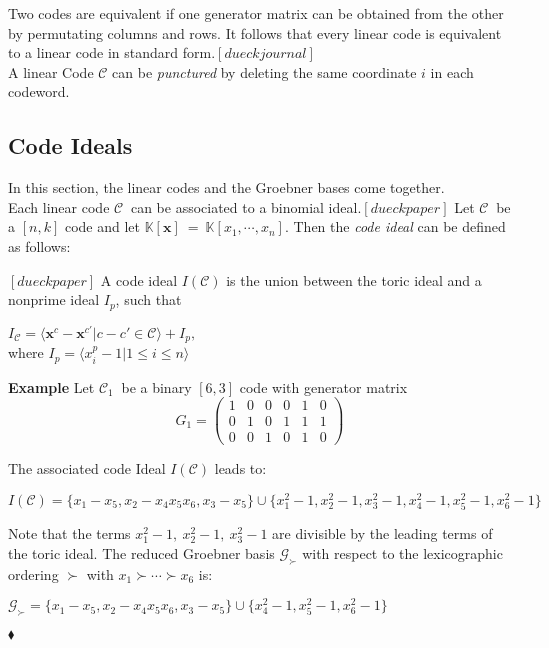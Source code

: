 Two codes are equivalent if one generator matrix can be obtained from the other by permutating columns and rows.
It follows that every linear code is equivalent to a linear code in standard form.$[dueckjournal]$ \\

A linear Code $\mathcal{C}$ can be \textit{punctured} by deleting the same coordinate $i$ in each codeword.


\subsection{Code Ideals}
\label{subsec:codeideals}
In this section, the linear codes and the Groebner bases come together.\\
Each linear code $\mathcal{C}~$ can be associated to a binomial ideal.$[dueckpaper]$ Let $\mathcal{C}~$ be a $[n,k]$ code and let 
$\mathbb{K}[\textbf{x}]~=~\mathbb{K}[x_{1},\cdots,x_{n}]$.
Then the \textit{code ideal} can be defined as follows:

\begin{env_definition}
$[dueckpaper]$ A code ideal $I(\mathcal{C})$ is the union between the toric ideal and a nonprime ideal $I_{p}$, such that
\begin{center}
$ I_{\mathcal{C}} = \langle \textbf{x}^{c} - \textbf{x}^{c'} | c - c' \in \mathcal{C}  \rangle + I_{p},$\\
\textrm{where}
 $I_{p} = \langle x_{i}^{p} - 1 | 1 \leq i \leq n \rangle $
\end{center}
\end{env_definition}


\textbf{Example} Let $\mathcal{C}_{1}~$ be a binary $[6,3]$ code with generator matrix
\[
G_{1} =
\begin{pmatrix}
1 & 0 & 0 & 0 & 1 & 0 \\ 
0 & 1 & 0 & 1 & 1 & 1 \\  
0 & 0 & 1 & 0 & 1 & 0  
\end{pmatrix} 
\]

The associated code Ideal $I(\mathcal{C})$ leads to: \newline
\begin{center}
$I(\mathcal{C}) = \{x_{1}-x_{5},x_{2}-x_{4}x_{5}x_{6},x_{3}-x_{5}  \} \cup \{x_{1}^{2}-1,x_{2}^{2}-1,x_{3}^{2}-1,x_{4}^{2}-1,x_{5}^{2}-1,x_{6}^{2}-1\}  $
\end{center}
Note that the terms $x_{1}^{2}-1,~x_{2}^{2}-1,~x_{3}^{2}-1 $ are divisible by the leading terms of the toric ideal.
The reduced Groebner basis $\mathcal{G}_{\succ}$ with respect to the lexicographic ordering $\succ$ with $x_{1} \succ \cdots \succ x_{6}$ is:
\begin{center}
$ \mathcal{G}_{\succ} = \{x_{1}-x_{5},x_{2}-x_{4}x_{5}x_{6},x_{3}-x_{5}  \} \cup \{x_{4}^{2}-1,x_{5}^{2}-1,x_{6}^{2}-1  \}  $
\end{center}

\begin{flushright}
$\blacklozenge$
\end{flushright} 

 

\newpage
